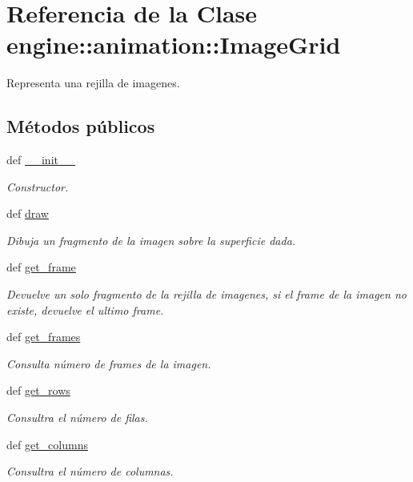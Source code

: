 \hypertarget{classengine_1_1animation_1_1ImageGrid}{
\section{\-Referencia de la \-Clase engine\-:\-:animation\-:\-:\-Image\-Grid}
\label{classengine_1_1animation_1_1ImageGrid}
}


\-Representa una rejilla de imagenes.  


\subsection*{\-Métodos públicos}
\begin{DoxyCompactItemize}
\item 
def \hyperlink{classengine_1_1animation_1_1ImageGrid_a6d91092ccb8473245e3f25d22567fdae}{\-\_\-\-\_\-init\-\_\-\-\_\-}
\begin{DoxyCompactList}\small\item\em \-Constructor. \end{DoxyCompactList}\item 
def \hyperlink{classengine_1_1animation_1_1ImageGrid_ae820f9156aeab7e96bad0f8f90533ca6}{draw}
\begin{DoxyCompactList}\small\item\em \-Dibuja un fragmento de la imagen sobre la superficie dada. \end{DoxyCompactList}\item 
def \hyperlink{classengine_1_1animation_1_1ImageGrid_afa3fcb5bfe681bf7095b561655e56d69}{get\-\_\-frame}
\begin{DoxyCompactList}\small\item\em \-Devuelve un solo fragmento de la rejilla de imagenes, si el frame de la imagen no existe, devuelve el ultimo frame. \end{DoxyCompactList}\item 
def \hyperlink{classengine_1_1animation_1_1ImageGrid_a77f50b1a227d6a847a1d9827bc2d6cc2}{get\-\_\-frames}
\begin{DoxyCompactList}\small\item\em \-Consulta número de frames de la imagen. \end{DoxyCompactList}\item 
def \hyperlink{classengine_1_1animation_1_1ImageGrid_a70fdc58fbb3d0bd57bf983291f2a5774}{get\-\_\-rows}
\begin{DoxyCompactList}\small\item\em \-Consultra el número de filas. \end{DoxyCompactList}\item 
def \hyperlink{classengine_1_1animation_1_1ImageGrid_ad7390b81260e5b81b10ade807350dbda}{get\-\_\-columns}
\begin{DoxyCompactList}\small\item\em \-Consultra el número de columnas. \end{DoxyCompactList}\end{DoxyCompactItemize}
